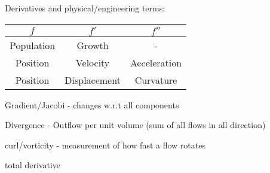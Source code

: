 Derivatives and physical/engineering  terms: 

\begin{tabular}{c|c|c}
	$f$ & $f'$ & $f''$ \\
	\hline
	Population & Growth & - \\ 
	\hline
	Position & Velocity & Acceleration \\
	\hline
	Position & Displacement & Curvature
\end{tabular}

Gradient/Jacobi - changes w.r.t all components

Divergence - Outflow per unit volume (sum of all flows in all direction)

curl/vorticity - measurement of how fast a flow rotates

total derivative

